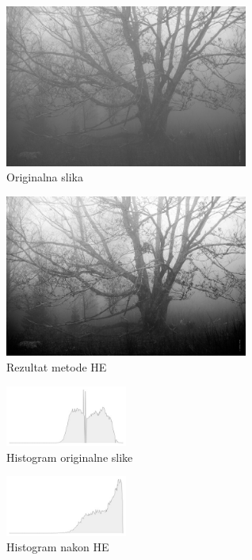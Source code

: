 \documentclass[12pt,a4paper]{article}
\theoremstyle{definition}
\theoremstyle{remark}
\theoremstyle{plain}
\begin{document}
\begin{multicols}{2}
\begin{figure}[H]
\centering
\includegraphics[width=8cm]{images/tree.jpg}
  \caption{Originalna slika}\label{river}
\end{figure}
\columnbreak
\begin{figure}[H]
\centering
\includegraphics[width=8cm]{images/global_HE.jpg}
  \caption{Rezultat metode HE}\label{river_output2}
\end{figure}
\end{multicols}

\begin{multicols}{2}
\begin{figure}[H]
\centering
\includegraphics[width=4cm]{images/tree_hist.jpg}
  \caption{Histogram originalne slike}
\end{figure}
\columnbreak
\begin{figure}[H]
\centering
\includegraphics[width=4cm]{images/tree_HE.jpg}
  \caption{Histogram nakon HE}
\end{figure}
\end{multicols}
\end{document}
